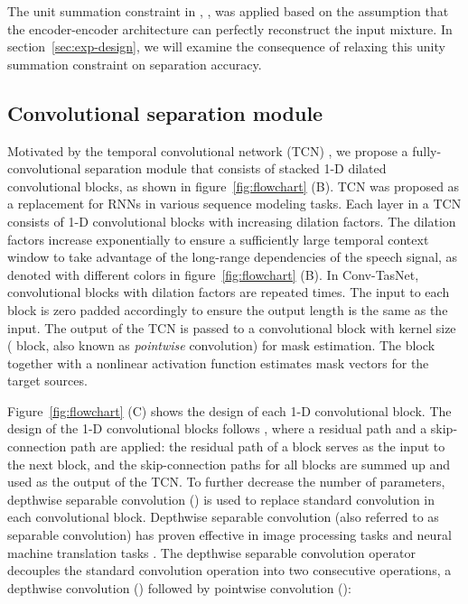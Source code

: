 \documentclass[journal]{IEEEtran}
\begin{document}
The unit summation constraint in \cite{luo2018tasnet, luo2018real}, , was applied based on the assumption that the encoder-encoder architecture can perfectly reconstruct the input mixture. In section~\ref{sec:exp-design}, we will examine the consequence of relaxing this unity summation constraint on separation accuracy.

\subsection{Convolutional separation module}

Motivated by the temporal convolutional network (TCN) \cite{lea2016temporal, lea2017temporal, bai2018empirical}, we propose a fully-convolutional separation module that consists of stacked 1-D dilated convolutional blocks, as shown in figure~\ref{fig:flowchart} (B). TCN was proposed as a replacement for RNNs in various sequence modeling tasks. Each layer in a TCN consists of 1-D convolutional blocks with increasing dilation factors. The dilation factors increase exponentially to ensure a sufficiently large temporal context window to take advantage of the long-range dependencies of the speech signal, as denoted with different colors in figure~\ref{fig:flowchart} (B). In Conv-TasNet,  convolutional blocks with dilation factors  are repeated  times. The input to each block is zero padded accordingly to ensure the output length is the same as the input. The output of the TCN is passed to a convolutional block with kernel size  ( block, also known as \textit{pointwise} convolution) for mask estimation. The  block together with a nonlinear activation function estimates  mask vectors for the  target sources.

Figure~\ref{fig:flowchart} (C) shows the design of each 1-D convolutional block. The design of the 1-D convolutional blocks follows \cite{van2016wavenet}, where a residual path and a skip-connection path are applied: the residual path of a block serves as the input to the next block, and the skip-connection paths for all blocks are summed up and used as the output of the TCN. To further decrease the number of parameters, depthwise separable convolution () is used to replace standard convolution in each convolutional block. Depthwise separable convolution (also referred to as separable convolution) has proven effective in image processing tasks \cite{chollet2016xception, howard2017mobilenets} and neural machine translation tasks \cite{kaiser2017depthwise}. The depthwise separable convolution operator decouples the standard convolution operation into two consecutive operations, a depthwise convolution () followed by pointwise convolution ():
\end{document}
